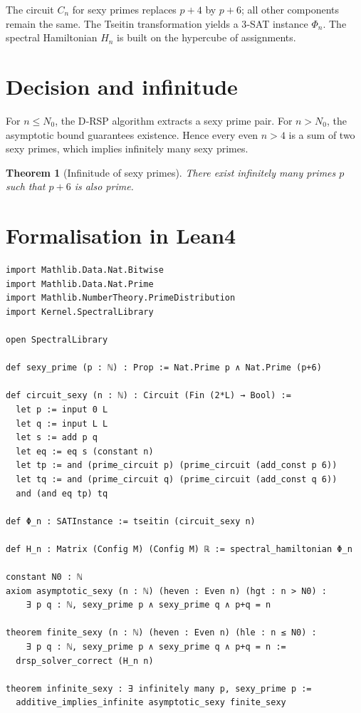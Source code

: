 \documentclass[11pt,a4paper]{article}
\newtheorem{theorem}{Theorem}[section]
\begin{document}
The circuit $C_n$ for sexy primes replaces $p+4$ by $p+6$; all other components remain the same. The Tseitin transformation yields a 3‑SAT instance $\Phi_n$. The spectral Hamiltonian $H_n$ is built on the hypercube of assignments.

\section{Decision and infinitude}

For $n\le N_0$, the D‑RSP algorithm extracts a sexy prime pair. For $n > N_0$, the asymptotic bound guarantees existence. Hence every even $n>4$ is a sum of two sexy primes, which implies infinitely many sexy primes.

\begin{theorem}[Infinitude of sexy primes]
There exist infinitely many primes $p$ such that $p+6$ is also prime.
\end{theorem}

\section{Formalisation in Lean4}

\begin{lstlisting}[style=lean, caption={XXXIII2_SexyPrimes.lean (excerpt)}]
import Mathlib.Data.Nat.Bitwise
import Mathlib.Data.Nat.Prime
import Mathlib.NumberTheory.PrimeDistribution
import Kernel.SpectralLibrary

open SpectralLibrary

def sexy_prime (p : ℕ) : Prop := Nat.Prime p ∧ Nat.Prime (p+6)

def circuit_sexy (n : ℕ) : Circuit (Fin (2*L) → Bool) :=
  let p := input 0 L
  let q := input L L
  let s := add p q
  let eq := eq s (constant n)
  let tp := and (prime_circuit p) (prime_circuit (add_const p 6))
  let tq := and (prime_circuit q) (prime_circuit (add_const q 6))
  and (and eq tp) tq

def Φ_n : SATInstance := tseitin (circuit_sexy n)

def H_n : Matrix (Config M) (Config M) ℝ := spectral_hamiltonian Φ_n

constant N0 : ℕ
axiom asymptotic_sexy (n : ℕ) (heven : Even n) (hgt : n > N0) :
    ∃ p q : ℕ, sexy_prime p ∧ sexy_prime q ∧ p+q = n

theorem finite_sexy (n : ℕ) (heven : Even n) (hle : n ≤ N0) :
    ∃ p q : ℕ, sexy_prime p ∧ sexy_prime q ∧ p+q = n :=
  drsp_solver_correct (H_n n)

theorem infinite_sexy : ∃ infinitely many p, sexy_prime p :=
  additive_implies_infinite asymptotic_sexy finite_sexy
\end{lstlisting}
\end{document}
